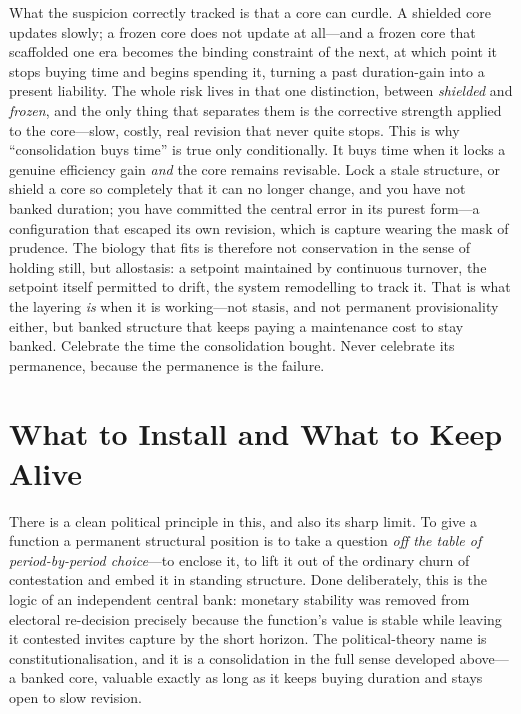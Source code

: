 \documentclass{article}
\begin{document}
What the suspicion correctly tracked is that a core can curdle. A shielded core updates slowly; a frozen core does not update at all---and a frozen core that scaffolded one era becomes the binding constraint of the next, at which point it stops buying time and begins spending it, turning a past duration-gain into a present liability. The whole risk lives in that one distinction, between \textit{shielded} and \textit{frozen}, and the only thing that separates them is the corrective strength applied to the core---slow, costly, real revision that never quite stops. This is why ``consolidation buys time'' is true only conditionally. It buys time when it locks a genuine efficiency gain \textit{and} the core remains revisable. Lock a stale structure, or shield a core so completely that it can no longer change, and you have not banked duration; you have committed the central error in its purest form---a configuration that escaped its own revision, which is capture wearing the mask of prudence. The biology that fits is therefore not conservation in the sense of holding still, but allostasis: a setpoint maintained by continuous turnover, the setpoint itself permitted to drift, the system remodelling to track it. That is what the layering \textit{is} when it is working---not stasis, and not permanent provisionality either, but banked structure that keeps paying a maintenance cost to stay banked. Celebrate the time the consolidation bought. Never celebrate its permanence, because the permanence is the failure.

\section*{What to Install and What to Keep Alive}

There is a clean political principle in this, and also its sharp limit. To give a function a permanent structural position is to take a question \textit{off the table of period-by-period choice}---to enclose it, to lift it out of the ordinary churn of contestation and embed it in standing structure. Done deliberately, this is the logic of an independent central bank: monetary stability was removed from electoral re-decision precisely because the function's value is stable while leaving it contested invites capture by the short horizon. The political-theory name is constitutionalisation, and it is a consolidation in the full sense developed above---a banked core, valuable exactly as long as it keeps buying duration and stays open to slow revision.
\end{document}
